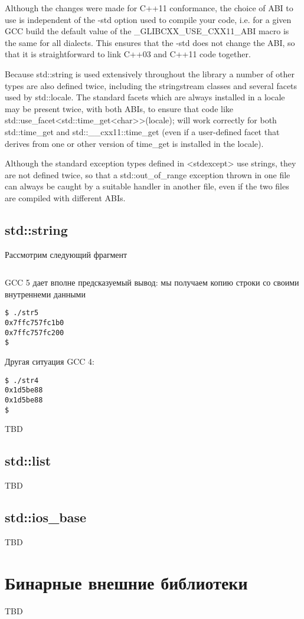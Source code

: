 \documentclass[14pt,a4paper]{article}
\begin{document}
Although the changes were made for C++11 conformance, the choice of
ABI to use is independent of the -std option used to compile your
code, i.e. for a given GCC build the default value of the
\_GLIBCXX\_USE\_CXX11\_ABI macro is the same for all dialects. This
ensures that the -std does not change the ABI, so that it is
straightforward to link C++03 and C++11 code together.

Because std::string is used extensively throughout the library a
number of other types are also defined twice, including the
stringstream classes and several facets used by std::locale. The
standard facets which are always installed in a locale may be present
twice, with both ABIs, to ensure that code like
std::use\_facet<std::time_get<char>>(locale); will work correctly for
both std::time\_get and std::\_\_cxx11::time\_get (even if a user-defined
facet that derives from one or other version of time\_get is installed
in the locale). 

Although the standard exception types defined in <stdexcept> use
strings, they are not defined twice, so that a std::out\_of\_range
exception thrown in one file can always be caught by a suitable
handler in another file, even if the two files are compiled with
different ABIs. 

\subsection{std::string}

Рассмотрим следующий фрагмент
\inputminted{c++}{./src/str.cpp}

GCC 5 дает вполне предсказуемый вывод: мы получаем копию строки со
своими внутреннеми данными
\begin{verbatim}
$ ./str5
0x7ffc757fc1b0
0x7ffc757fc200
$
\end{verbatim}

Другая ситуация GCC 4:
\begin{verbatim}
$ ./str4
0x1d5be88
0x1d5be88
$
\end{verbatim}


TBD

\subsection{std::list}

TBD

\subsection{std::ios\_base}

TBD

\section{Бинарные внешние библиотеки}

TBD
\end{document}
